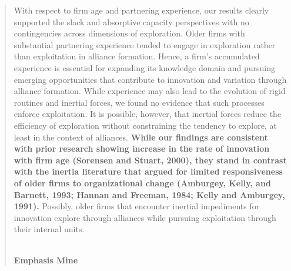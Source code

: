 \begin{quote}
With respect to firm age and partnering experience, our results clearly supported the slack and absorptive capacity perspectives with no contingencies across dimensions of exploration.  Older firms with substantial partnering experience tended to engage in exploration rather than exploitation in alliance formation. Hence, a firm’s accumulated experience is essential for expanding its knowledge domain and pursuing emerging opportunities that contribute to innovation and variation through alliance formation. While experience may also lead to the evolution of rigid routines and inertial forces, we found no evidence that such processes enforce exploitation. It is possible, however, that inertial forces reduce the efficiency of exploration without constraining the tendency to explore, at least in the context of alliances. \textbf{While our findings are consistent with prior research showing increase in the rate of innovation with firm age (Sorensen and Stuart, 2000), they stand in contrast with the inertia literature that argued for limited responsiveness of older firms to organizational change (Amburgey, Kelly, and Barnett, 1993; Hannan and Freeman, 1984; Kelly and Amburgey, 1991).} Possibly, older firms that encounter inertial impediments for innovation explore through alliances while pursuing exploitation through their internal units.
\begin{flushright}
\cite[p.B6]{lavie2006balancing} \\
\textbf{Emphasis Mine}
\end{flushright}
\end{quote}

